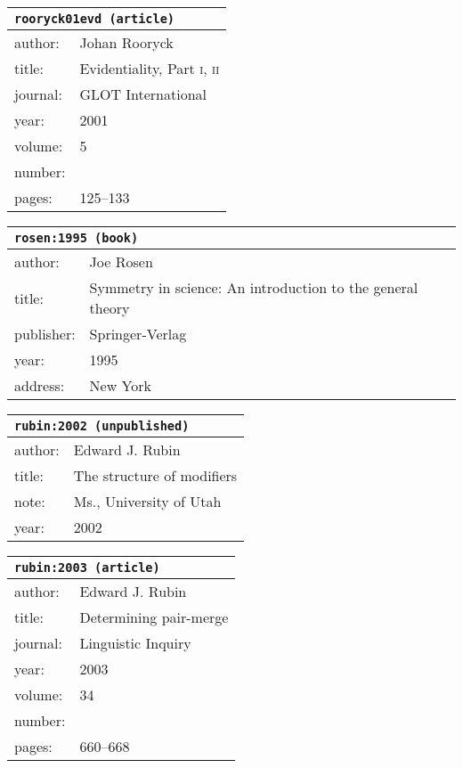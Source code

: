 \documentclass{article}
\begin{document}
\bigskip

\begin{tabular}{p{}p{}}
\multicolumn{2}{l}{\texttt{rooryck01evd (article)}}\\
\hline
author: & Johan Rooryck\\
title: & Evidentiality, Part \textsc{i}, \textsc{ii}\\
journal: & GLOT International\\
year: & 2001\\
volume: & 5\\
number: & \\
pages: & 125--133\\
\end{tabular}

\bigskip

\begin{tabular}{p{}p{}}
\multicolumn{2}{l}{\texttt{rosen:1995 (book)}}\\
\hline
author: & Joe Rosen\\
title: & Symmetry in science: An introduction to the general theory\\
publisher: & Springer-Verlag\\
year: & 1995\\
address: & New York\\
\end{tabular}

\bigskip

\begin{tabular}{p{}p{}}
\multicolumn{2}{l}{\texttt{rubin:2002 (unpublished)}}\\
\hline
author: & Edward J. Rubin\\
title: & The structure of modifiers\\
note: & \textsc{M}s., University of Utah\\
year: & 2002\\
\end{tabular}

\bigskip

\begin{tabular}{p{}p{}}
\multicolumn{2}{l}{\texttt{rubin:2003 (article)}}\\
\hline
author: & Edward J. Rubin\\
title: & Determining pair-merge\\
journal: & Linguistic Inquiry\\
year: & 2003\\
volume: & 34\\
number: & \\
pages: & 660--668\\
\end{tabular}
\end{document}
